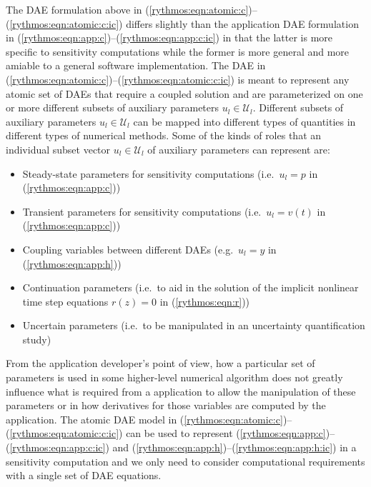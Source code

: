 \documentclass[pdf,ps2pdf,11pt]{SANDreport}
\begin{document}
The DAE formulation above in
(\ref{rythmos:eqn:atomic:c})--(\ref{rythmos:eqn:atomic:c:ic}) differs slightly
than the application DAE formulation in
(\ref{rythmos:eqn:app:c})--(\ref{rythmos:eqn:app:c:ic}) in that the latter is
more specific to sensitivity computations while the former is more general and
more amiable to a general software implementation.  The DAE in
(\ref{rythmos:eqn:atomic:c})--(\ref{rythmos:eqn:atomic:c:ic}) is meant to
represent any atomic set of DAEs that require a coupled solution and are
parameterized on one or more different subsets of auxiliary parameters
$u_l\in\mathcal{U}_l$.  Different subsets of auxiliary parameters
$u_l\in\mathcal{U}_l$ can be mapped into different types of quantities in
different types of numerical methods.  Some of the kinds of roles that an
individual subset vector $u_l\in\mathcal{U}_l$ of auxiliary parameters can
represent are:
%
\begin{itemize}
%
{}\item Steady-state parameters for sensitivity computations (i.e.\ $u_l =
p$ in (\ref{rythmos:eqn:app:c}))
%
{}\item Transient parameters for sensitivity computations (i.e.\ $u_l = v(t)$
in (\ref{rythmos:eqn:app:c}))
%
{}\item Coupling variables between different DAEs (e.g.\ $u_l = y$ in
(\ref{rythmos:eqn:app:h}))
%
{}\item Continuation parameters (i.e.\ to aid in the solution of the implicit
nonlinear time step equations $r(z)=0$ in (\ref{rythmos:eqn:r}))
%
{}\item Uncertain parameters (i.e.\ to be manipulated in an uncertainty
quantification study)
%
\end{itemize}

From the application developer's point of view, how a particular set of
parameters is used in some higher-level numerical algorithm does not greatly
influence what is required from a application to allow the manipulation of
these parameters or in how derivatives for those variables are computed by the
application.  The atomic DAE model in
(\ref{rythmos:eqn:atomic:c})--(\ref{rythmos:eqn:atomic:c:ic}) can be used to
represent (\ref{rythmos:eqn:app:c})--(\ref{rythmos:eqn:app:c:ic}) and
(\ref{rythmos:eqn:app:h})--(\ref{rythmos:eqn:app:h:ic}) in a sensitivity
computation and we only need to consider computational requirements with a
single set of DAE equations.
\end{document}
